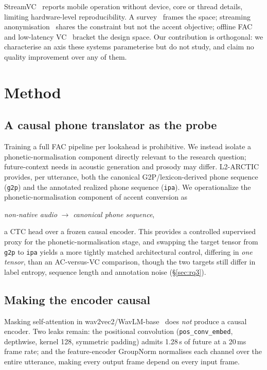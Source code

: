 \documentclass[journal]{IEEEtran}
\begin{document}
StreamVC~\cite{streamvc2024} reports mobile operation without device, core or
thread details, limiting hardware-level reproducibility. A
survey~\cite{acsurvey2026} frames the space; streaming
anonymisation~\cite{streamvoiceanon2026, streamvoiceanonplus2026, e2eanon2024}
shares the constraint but not the accent objective; offline
FAC~\cite{zhao2021fac, accentron2022} and low-latency VC~\cite{llvc2023}
bracket the design space. Our contribution is orthogonal: we characterise an
axis these systems parameterise but do not study, and claim no quality
improvement over any of them.

\section{Method}

\subsection{A causal phone translator as the probe}
\label{sec:method-translator}

Training a full FAC pipeline per lookahead is prohibitive. We instead isolate
a phonetic-normalisation component directly relevant to the research question;
future-context needs in acoustic generation and prosody may differ. L2-ARCTIC~\cite{l2arctic2018}
provides, per utterance, both the canonical G2P/lexicon-derived phone sequence
(\texttt{g2p}) and the annotated realized phone sequence (\texttt{ipa}). We operationalize the phonetic-normalisation component of accent conversion as
\begin{center}
\emph{non-native audio} $\rightarrow$ \emph{canonical phone sequence},
\end{center}
a CTC head over a frozen causal encoder. This provides a controlled supervised proxy for the
phonetic-normalisation stage, and swapping the target tensor from
\texttt{g2p} to \texttt{ipa} yields a more tightly matched architectural
control, differing in \emph{one tensor}, than an AC-versus-VC comparison,
though the two targets still differ in label entropy, sequence length and
annotation noise (\S\ref{sec:rq3}).

\subsection{Making the encoder causal}
\label{sec:causal}

Masking self-attention in wav2vec2/WavLM-base~\cite{wavlm2022, wav2vec2} does
\emph{not} produce a causal encoder. Two leaks remain: the positional
convolution (\texttt{pos\_conv\_embed}, depthwise, kernel 128, symmetric
padding) admits 1.28\,s of future at a 20\,ms frame rate; and the
feature-encoder GroupNorm normalises each channel over the entire utterance,
making every output frame depend on every input frame.
\end{document}

